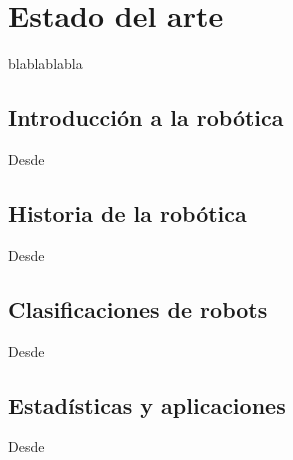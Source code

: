 \chapter{Estado del arte}\label{CAP2}
blablablabla

\section{Introducción a la robótica}
    Desde
    


\section{Historia de la robótica}
    Desde


    
\section{Clasificaciones de robots}
    Desde

    
    
    
\section{Estadísticas y aplicaciones}
    Desde
    

